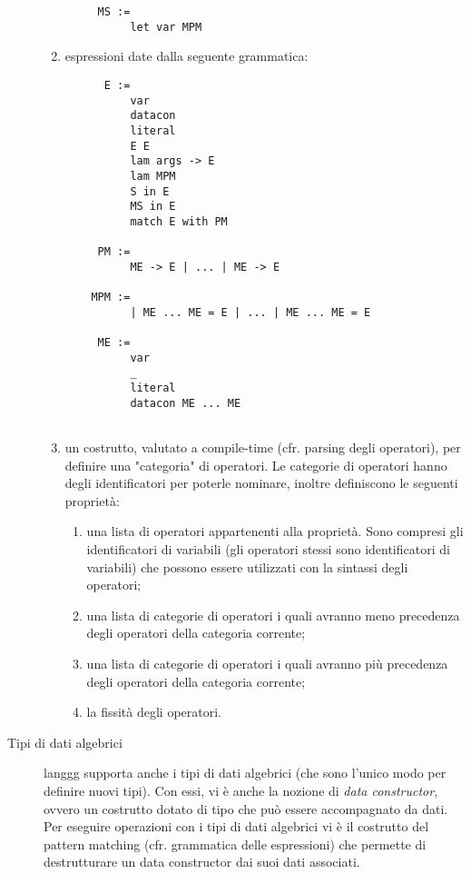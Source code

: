 \documentclass[10pt,a4paper]{article}
\begin{document}
\begin{description}
\begin{enumerate}
\begin{lstlisting}
     MS :=
          let var MPM
    \end{lstlisting}
    \item espressioni date dalla seguente grammatica:
    \begin{lstlisting}
      E :=
          var
          datacon
          literal
          E E
          lam args -> E
          lam MPM
          S in E
          MS in E
          match E with PM

     PM :=
          ME -> E | ... | ME -> E

    MPM :=
          | ME ... ME = E | ... | ME ... ME = E

     ME :=
          var
          _
          literal
          datacon ME ... ME
          
    \end{lstlisting}
    \item un costrutto, valutato a compile-time (cfr. parsing degli operatori), per definire una "categoria" di
    operatori. Le categorie di operatori hanno degli identificatori per poterle nominare, inoltre definiscono le
    seguenti proprietà:
        \begin{enumerate}
        \item una lista di operatori appartenenti alla proprietà. Sono compresi gli identificatori di variabili (gli
        operatori stessi sono identificatori di variabili) che possono essere utilizzati con la sintassi degli operatori;
        \item una lista di categorie di operatori i quali avranno meno precedenza degli operatori della categoria
        corrente;
        \item una lista di categorie di operatori i quali avranno più precedenza degli operatori della categoria
        corrente;
        \item la fissità degli operatori.
        \end{enumerate}
    \end{enumerate}
\item[Tipi di dati algebrici] langgg supporta anche i tipi di dati algebrici (che sono l'unico modo per definire nuovi
tipi). Con essi, vi è anche la nozione di \textit{data constructor}, ovvero un costrutto dotato di tipo che può essere
accompagnato da dati. Per eseguire operazioni con i tipi di dati algebrici vi è il costrutto del pattern matching
(cfr. grammatica delle espressioni) che permette di destrutturare un data constructor dai suoi dati associati.

\end{description}
\end{document}
